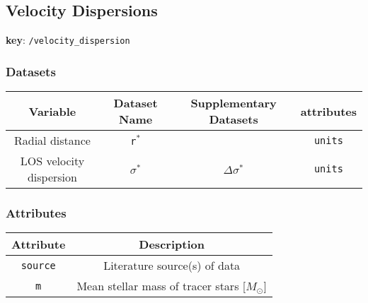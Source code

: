 \subsection{Velocity Dispersions}

\textbf{key}: \texttt{/velocity\_dispersion}

\subsubsection{Datasets}

\begin{center}
\begin{tabular}{ | c | c | c | c | }
    \hline
    Variable & Dataset Name & Supplementary Datasets &  attributes \\
    \hline\hline
    Radial distance & \texttt{r\(^*\)} & & \texttt{units} \\
    \hline
    LOS velocity dispersion & \texttt{\(\sigma^*\)} & \texttt{\(\Delta\sigma^*\)} &
    \texttt{units}\\
    \hline
\end{tabular}
\end{center}

\subsubsection{Attributes}


\begin{center}
\begin{tabular}{ | c | c | }
    \hline
    Attribute & Description \\
    \hline\hline
    \texttt{source} & Literature source(s) of data \\
    \hline
    \texttt{m} & Mean stellar mass of tracer stars [\(M_\odot\)] \\
    \hline
\end{tabular}
\end{center}
